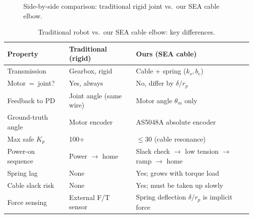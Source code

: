 \documentclass[11pt,a4paper]{article}
\begin{document}
\begin{figure}[H]
\caption{Side-by-side comparison: traditional rigid joint vs.\ our SEA cable elbow.}
\label{fig:compare}
\end{figure}

\begin{table}[H]
\centering
\caption{Traditional robot vs.\ our SEA cable elbow: key differences.}
\begin{tabular}{lll}
\toprule
\textbf{Property} & \textbf{Traditional (rigid)} & \textbf{Ours (SEA cable)} \\
\midrule
Transmission      & Gearbox, rigid           & Cable + spring ($k_s, b_c$) \\
Motor~=~joint?    & Yes, always              & No, differ by $\delta/r_p$ \\
Feedback to PD    & Joint angle (same wire)  & Motor angle $\theta_m$ only \\
Ground-truth angle& Motor encoder            & AS5048A absolute encoder \\
Max safe $K_p$    & 100+                     & $\le 30$ (cable resonance) \\
Power-on sequence & Power $\to$ home         & Slack check $\to$ low tension $\to$ ramp $\to$ home \\
Spring lag        & None                     & Yes; grows with torque load \\
Cable slack risk  & None                     & Yes; must be taken up slowly \\
Force sensing     & External F/T sensor      & Spring deflection $\delta/r_p$ is implicit force \\
\bottomrule
\end{tabular}
\end{table}

\end{document}
